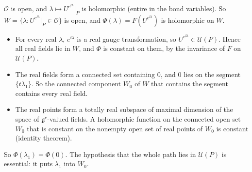 \begin{detail}\label{d8:ix15}
$\mathcal O$ is open, and $\lambda\mapsto U^{e^{\ii\lambda}}|_P$ is holomorphic (entire in the bond variables). So $W=\{\lambda:U^{e^{\ii\lambda}}|_P\in\mathcal O\}$ is open, and $\Phi(\lambda)=F(U^{e^{\ii\lambda}})$ is holomorphic on $W$.
\begin{itemize}
\item For every real $\lambda$, $e^{\ii\lambda}$ is a real gauge transformation, so $U^{e^{\ii\lambda}}\in\mathcal U(P)$. Hence all real fields lie in $W$, and $\Phi$ is constant on them, by the invariance of $F$ on $\mathcal U(P)$.
\item The real fields form a connected set containing $0$, and $0$ lies on the segment $\{t\lambda_1\}$. So the connected component $W_0$ of $W$ that contains the segment contains every real field.
\item The real points form a totally real subspace of maximal dimension of the space of $\mathfrak g^c$-valued fields. A holomorphic function on the connected open set $W_0$ that is constant on the nonempty open set of real points of $W_0$ is constant (identity theorem).
\end{itemize}
So $\Phi(\lambda_1)=\Phi(0)$. The hypothesis that the whole path lies in $\mathcal U(P)$ is essential: it puts $\lambda_1$ into $W_0$.
\end{detail}

